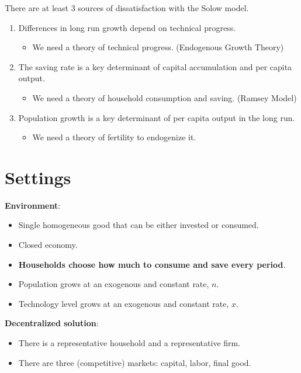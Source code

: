 

There are at least 3 sources of dissatisfaction with the Solow model. \begin{enumerate}
    \item Differences in long run growth depend on technical progress. \begin{itemize}
              \item We need a theory of technical progress. (Endogenous Growth Theory)
          \end{itemize}
    \item The saving rate is a key determinant of capital accumulation and per capita output. \begin{itemize}
              \item We need a theory of household consumption and saving. (Ramsey Model)
          \end{itemize}
    \item Population growth is a key determinant of per capita output in the long run. \begin{itemize}
              \item We need a theory of fertility to endogenize it.
          \end{itemize}
\end{enumerate}

\section{Settings}

\textbf{Environment}: \begin{itemize}
    \item Single homogeneous good that can be either invested or consumed.
    \item Closed economy.
    \item \textbf{Households choose how much to consume and save every period}.
    \item Population grows at an exogenous and constant rate, $n$.
    \item Technology level grows at an exogenous and constant rate, $x$.
\end{itemize}


\textbf{Decentralized solution}: \begin{itemize}
    \item There is a representative household and a representative firm.
    \item There are three (competitive) markets: capital, labor, final good.
\end{itemize}

